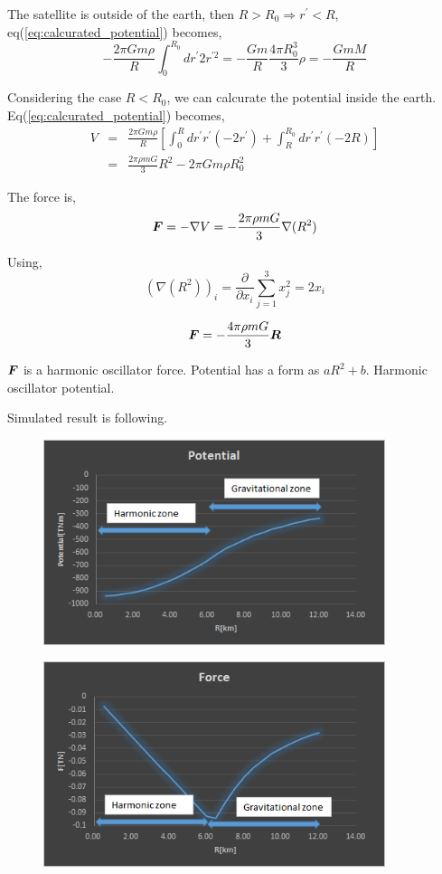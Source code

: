 \documentclass{jarticle}
\newcommand*{\mbold}[1]{\mbox{\boldmath $#1$}}
\begin{document}
The satellite is outside of the earth, then $R > R_0 \Rightarrow r^\prime < R$, eq(\ref{eq:calcurated_potential}) becomes,
\begin{equation}
	-\frac{2\pi Gm\rho}{R} \int_0^{R_0} dr^\prime 2r^{\prime 2} = -\frac{Gm}{R}\frac{4\pi R_0^3}{3}\rho = -\frac{GmM}{R}
\end{equation}

Considering the case $R < R_0$, we can calcurate the potential inside the earth. 
Eq(\ref{eq:calcurated_potential}) becomes,
\begin{eqnarray}
	V &=& \frac{2\pi Gm\rho}{R} \left[ \int_0^R dr^\prime r^\prime (-2r^\prime) + \int_R^{R_0} dr^\prime r^\prime (-2R) \right] \nonumber \\
	&=& \frac{2\pi \rho mG}{3}R^2 - 2\pi G m\rho R_0^2
\end{eqnarray}

The force is,
\begin{equation}
	\mbold{F} = -\nabla V = -\frac{2\pi \rho m G}{3}\nabla (R^2)
\end{equation} 

Using, 
\[
	(\nabla (R^2))_i = \frac{\partial}{\partial x_i}\sum_{j=1}^3 x_j^2 = 2x_i
\]

\begin{equation}
	\mbold{F} = -\frac{4\pi \rho m G}{3}\mbold{R}
\end{equation}

$\mbold{F}$ is a harmonic oscillator force. Potential has a form as $aR^2 +b$. Harmonic oscillator potential.

Simulated result is following.
\begin{figure}[htbp]
	\includegraphics[width=10cm]{potential_plot.png}
\end{figure}
\begin{figure}[htbp]
	\includegraphics[width=10cm]{force_plot.png}
\end{figure}
\end{document}
